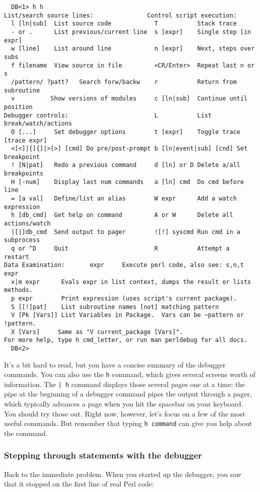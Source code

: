 \begin{lstlisting}
  DB<1> h h
List/search source lines:               Control script execution:
  l [ln|sub]  List source code            T           Stack trace
  - or .      List previous/current line  s [expr]    Single step [in expr]
  w [line]    List around line            n [expr]    Next, steps over subs
  f filename  View source in file         <CR/Enter>  Repeat last n or s
  /pattern/ ?patt?   Search forw/backw    r           Return from subroutine
  v          Show versions of modules     c [ln|sub]  Continue until position
Debugger controls:                        L           List break/watch/actions
  O [...]     Set debugger options        t [expr]    Toggle trace [trace expr]
  <[<]|{[{]|>[>] [cmd] Do pre/post-prompt b [ln|event|sub] [cnd] Set breakpoint
  ! [N|pat]   Redo a previous command     d [ln] or D Delete a/all breakpoints
  H [-num]    Display last num commands   a [ln] cmd  Do cmd before line
  = [a val]   Define/list an alias        W expr      Add a watch expression
  h [db_cmd]  Get help on command         A or W      Delete all actions/watch
  |[|]db_cmd  Send output to pager        ![!] syscmd Run cmd in a subprocess
  q or ^D     Quit                        R           Attempt a restart
Data Examination:       expr     Execute perl code, also see: s,n,t expr
  x|m expr      Evals expr in list context, dumps the result or lists methods.
  p expr        Print expression (uses script's current package).
  S [[!]pat]    List subroutine names [not] matching pattern
  V [Pk [Vars]] List Variables in Package.  Vars can be ~pattern or !pattern.
  X [Vars]     Same as "V current_package [Vars]".
For more help, type h cmd_letter, or run man perldebug for all docs.
  DB<2> 
\end{lstlisting}

It's a bit hard to read, but you have a concise summary of the debugger commands. You can also use the \verb|h| command, which gives several screens worth of information. The \verb=| h= command displays those several pages one at a time; the pipe at the beginning of a debugger command pipes the output through a pager, which typically advances a page when you hit the spacebar on your keyboard. You should try those out. Right now, however, let's focus on a few of the most useful commands. But remember that typing \verb|h command| can give you help about the command. 

\subsubsection{Stepping through statements with the debugger}
Back to the immediate problem. When you started up the debugger, you saw that it stopped on the first line of real Perl code:

